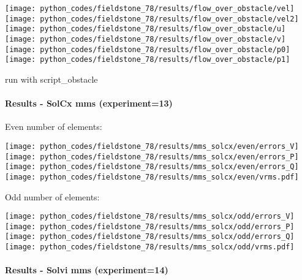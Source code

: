 \begin{center}
\texttt{[image: python\_codes/fieldstone\_78/results/flow\_over\_obstacle/vel]}
\texttt{[image: python\_codes/fieldstone\_78/results/flow\_over\_obstacle/vel2]}\\
\texttt{[image: python\_codes/fieldstone\_78/results/flow\_over\_obstacle/u]}
\texttt{[image: python\_codes/fieldstone\_78/results/flow\_over\_obstacle/v]}\\
\texttt{[image: python\_codes/fieldstone\_78/results/flow\_over\_obstacle/p0]}
\texttt{[image: python\_codes/fieldstone\_78/results/flow\_over\_obstacle/p1]}
\end{center}

run with script\_obstacle
 
\newpage
\paragraph{Results - SolCx mms (experiment=13)}

Even number of elements:

\begin{center}
\texttt{[image: python\_codes/fieldstone\_78/results/mms\_solcx/even/errors\_V]}
\texttt{[image: python\_codes/fieldstone\_78/results/mms\_solcx/even/errors\_P]}\\
\texttt{[image: python\_codes/fieldstone\_78/results/mms\_solcx/even/errors\_Q]}
\texttt{[image: python\_codes/fieldstone\_78/results/mms\_solcx/even/vrms.pdf]}
\end{center}

Odd number of elements:

\begin{center}
\texttt{[image: python\_codes/fieldstone\_78/results/mms\_solcx/odd/errors\_V]}
\texttt{[image: python\_codes/fieldstone\_78/results/mms\_solcx/odd/errors\_P]}\\
\texttt{[image: python\_codes/fieldstone\_78/results/mms\_solcx/odd/errors\_Q]}
\texttt{[image: python\_codes/fieldstone\_78/results/mms\_solcx/odd/vrms.pdf]}
\end{center}

\newpage
\paragraph{Results - Solvi mms (experiment=14)}

